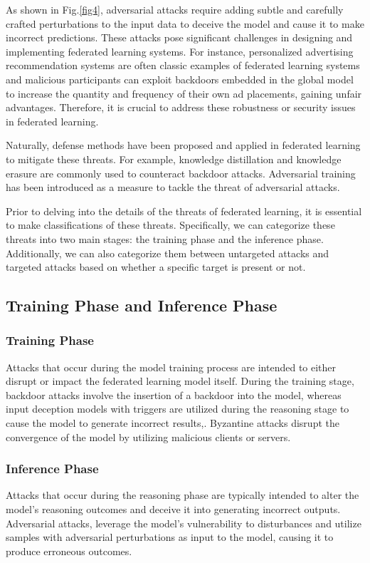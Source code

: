 \documentclass[conference]{IEEEtran}
\begin{document}
As shown in Fig.\ref{fig4}, adversarial attacks\cite{b23,b24,b25,b26} require adding subtle and carefully crafted perturbations 
to the input data to deceive the model and cause it to make incorrect predictions. 
These attacks pose significant challenges in designing and implementing 
federated learning systems. 
For instance, personalized advertising recommendation systems 
are often classic examples of federated learning systems 
and malicious participants can exploit backdoors embedded in the global model 
to increase the quantity and frequency of their own ad placements, 
gaining unfair advantages. 
Therefore, it is crucial to address these robustness or security issues 
in federated learning.

Naturally, defense methods have been proposed and applied in federated learning 
to mitigate these threats. 
For example, knowledge distillation\cite{b28} and knowledge erasure\cite{b29} 
are commonly used to counteract backdoor attacks. 
Adversarial training\cite{b23,b24} has been introduced as a measure to tackle 
the threat of adversarial attacks.

Prior to delving into the details of the threats of federated
learning, it is essential to make classifications of these threats. 
Specifically, we can categorize these threats into two main stages: the
training phase and the inference phase. Additionally, we
can also categorize them between untargeted attacks and targeted
attacks based on whether a specific target is present or
not.  

\subsection{Training Phase and Inference Phase}
\subsubsection{Training Phase}
Attacks that occur during the model training process are
intended to either disrupt or impact the federated learning model itself. 
During the training stage, 
backdoor attacks involve the insertion of a backdoor into the model, whereas
input deception models with triggers are utilized during the
reasoning stage to cause the model to generate incorrect results\cite{b30},\cite{b31}.
Byzantine attacks disrupt the convergence of the model by utilizing malicious
clients or servers\cite{b21}.
\subsubsection{Inference Phase}Attacks that occur during the reasoning phase are
typically intended to alter the model's reasoning outcomes and deceive it
into generating incorrect outputs\cite{b47}. 
Adversarial attacks, leverage the model's vulnerability
to disturbances and utilize samples with adversarial perturbations as input
to the model, causing it to produce erroneous outcomes.
\end{document}
